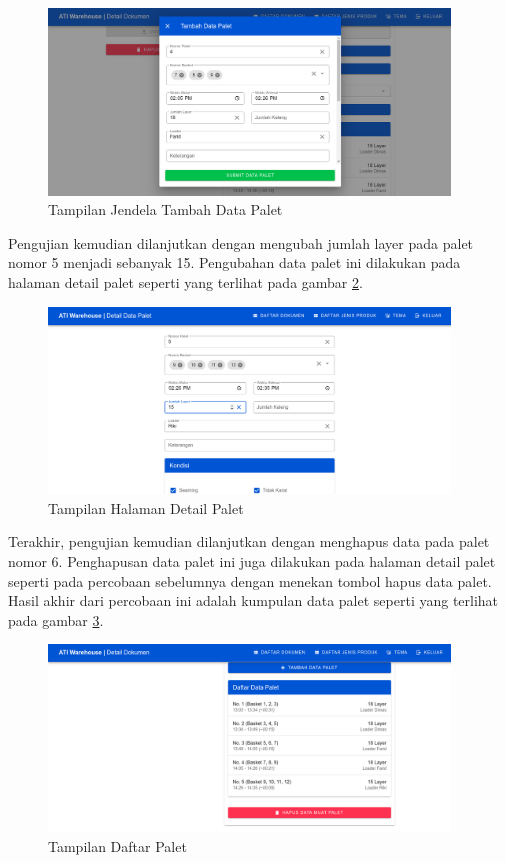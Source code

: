 \begin{figure} [ht!] \centering
  \includegraphics[width=0.95\textwidth]{gambar/tambah-palet.png}
  \caption{Tampilan Jendela Tambah Data Palet}
	\label{fig:tambahPalet}
\end{figure}

Pengujian kemudian dilanjutkan dengan mengubah jumlah layer pada palet nomor 5 menjadi sebanyak 15.
Pengubahan data palet ini dilakukan pada halaman detail palet seperti yang terlihat pada gambar \ref{fig:ubahPalet}.
\vspace{0.5ex}

\begin{figure} [ht!] \centering
  \includegraphics[width=0.95\textwidth]{gambar/ubah-palet.png}
  \caption{Tampilan Halaman Detail Palet}
	\label{fig:ubahPalet}
\end{figure}

Terakhir, pengujian kemudian dilanjutkan dengan menghapus data pada palet nomor 6.
Penghapusan data palet ini juga dilakukan pada halaman detail palet seperti pada percobaan sebelumnya dengan menekan tombol hapus data palet.
Hasil akhir dari percobaan ini adalah kumpulan data palet seperti yang terlihat pada gambar \ref{fig:daftarPalet}.
\vspace{0.5ex}

\begin{figure} [ht!] \centering
  \includegraphics[width=0.95\textwidth]{gambar/daftar-palet.png}
  \caption{Tampilan Daftar Palet}
	\label{fig:daftarPalet}
\end{figure}


